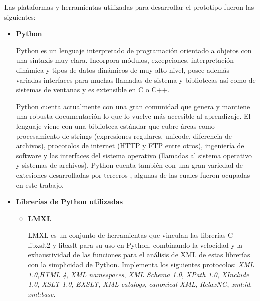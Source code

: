 	Las plataformas y herramientas utilizadas para desarrollar el prototipo fueron las siguientes:

\begin{itemize}
	\item \textbf{Python}
		
		Python es un lenguaje interpretado de programación orientado a objetos con una sintaxis muy clara. Incorpora módulos, excepciones, interpretación dinámica y tipos de datos dinámicos de muy alto nivel, posee además variadas interfaces para muchas llamadas de sistema y bibliotecas así como de sistemas de ventanas y es extensible en C o C++. 
		
		
		Python cuenta actualmente con una gran comunidad que genera y mantiene una robusta documentación lo que lo vuelve más accesible al aprendizaje. El lenguaje viene con una biblioteca estándar que cubre áreas como procesamiento de strings (expresiones regulares, unicode, diferencia de archivos), procotolos de internet (HTTP y FTP entre otros), ingeniería de software y las interfaces del sistema operativo (llamadas al sistema operativo y sistemas de archivos). Python cuenta también con una gran variedad de extesiones desarrolladas por terceros \cite{pythonPypiWeb}, algunas de las cuales fueron ocupadas en este trabajo.
		
	\item \textbf{Librerías de Python utilizadas}
		\begin{itemize}
			\item \textbf{LMXL}\label{itm:lxml}
			
			LMXL \cite{lxmlWebsite}  es un conjunto de herramientas que vinculan las librerías C libxslt2 y libxslt para su uso en Python, combinando la velocidad y la exhaustividad de las funciones para el análisis de XML de estas librerías con la simplicidad de Python.	Implementa los siguientes protocolos: \textit{XML 1.0},\textit{HTML 4}, \textit{XML namespaces}, \textit{XML Schema 1.0}, \textit{XPath 1.0},\textit{ XInclude 1.0}, \textit{XSLT 1.0}, \textit{EXSLT}, \textit{XML catalogs}, \textit{canonical XML}, \textit{RelaxNG}, \textit{xml:id}, \textit{xml:base}.		
			

\end{itemize}
\end{itemize}
